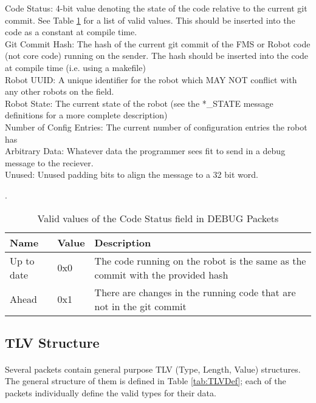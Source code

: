 \documentclass[11pt]{article}
\begin{document}
Code Status: 4-bit value denoting the state of the code relative to the current git commit.
See Table \ref{tab:CodeStatus} for a list of valid values.  This should be inserted into the code as a constant at compile time.\\
Git Commit Hash: The hash of the current git commit of the FMS or Robot code (not core code) running on the sender.
The hash should be inserted into the code at compile time (i.e. using a makefile)\\
Robot UUID: A unique identifier for the robot which MAY NOT conflict with any other robots on the field.\\
Robot State: The current state of the robot (see the *\_STATE message definitions for a more complete description)\\
Number of Config Entries: The current number of configuration entries the robot has\\
Arbitrary Data: Whatever data the programmer sees fit to send in a debug message to the reciever.\\
Unused:  Unused padding bits to align the message to a 32 bit word.\\

\begin{table}[h!]
    \centering
    \caption{Valid values of the Code Status field in DEBUG Packets}.
    \label{tab:CodeStatus}
    \begin{tabular}{|p{2in}|p{.8in}|p{3.25in}|}
        \hline
        Name & Value & Description \\
        \hline
        Up to date & 0x0 & The code running on the robot is the same as the commit with the provided hash \\
        \hline
        Ahead & 0x1 & There are changes in the running code that are not in the git commit\\
        \hline
    \end{tabular}
\end{table}

\subsection {TLV Structure}
\paragraph{}
Several packets contain general purpose TLV (Type, Length, Value) structures.
The general structure of them is defined in Table \ref{tab:TLVDef};
each of the packets individually define the valid types for their data.
\newline
\end{document}
